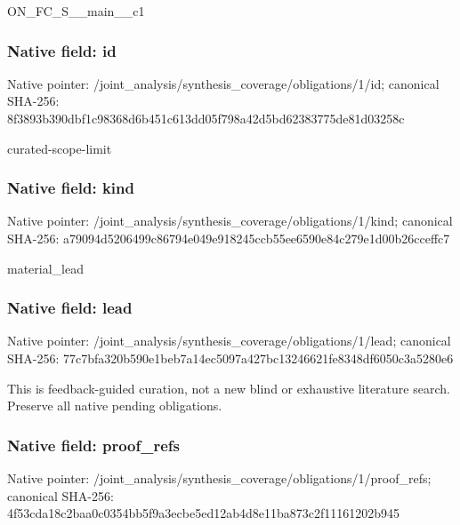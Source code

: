 \documentclass[10pt,a4paper]{article}
\begin{document}
\begingroup\raggedright\sloppy ON\_\allowbreak{}FC\_\allowbreak{}S\_\allowbreak{}\_\allowbreak{}main\_\allowbreak{}\_\allowbreak{}c1\par\endgroup

\subsubsection{Native field: id}
Native pointer: /joint\_\allowbreak{}analysis/synthesis\_\allowbreak{}coverage/obligations/1/id; canonical SHA-256: 8f3893b390dbf1c98368d6b451c613dd05f798a42d5bd62383775de81d03258c

\begingroup\raggedright\sloppy curated-scope-limit\par\endgroup

\subsubsection{Native field: kind}
Native pointer: /joint\_\allowbreak{}analysis/synthesis\_\allowbreak{}coverage/obligations/1/kind; canonical SHA-256: a79094d5206499c86794e049e918245ccb55ee6590e84c279e1d00b26cceffc7

\begingroup\raggedright\sloppy material\_\allowbreak{}lead\par\endgroup

\subsubsection{Native field: lead}
Native pointer: /joint\_\allowbreak{}analysis/synthesis\_\allowbreak{}coverage/obligations/1/lead; canonical SHA-256: 77c7bfa320b590e1beb7a14ec5097a427bc13246621fe8348df6050c3a5280e6

\begingroup\raggedright\sloppy This is feedback-guided curation,\allowbreak{} not a new blind or exhaustive literature search. Preserve all native pending obligations.\par\endgroup

\subsubsection{Native field: proof\_\allowbreak{}refs}
Native pointer: /joint\_\allowbreak{}analysis/synthesis\_\allowbreak{}coverage/obligations/1/proof\_\allowbreak{}refs; canonical SHA-256: 4f53cda18c2baa0c0354bb5f9a3ecbe5ed12ab4d8e11ba873c2f11161202b945
\end{document}
